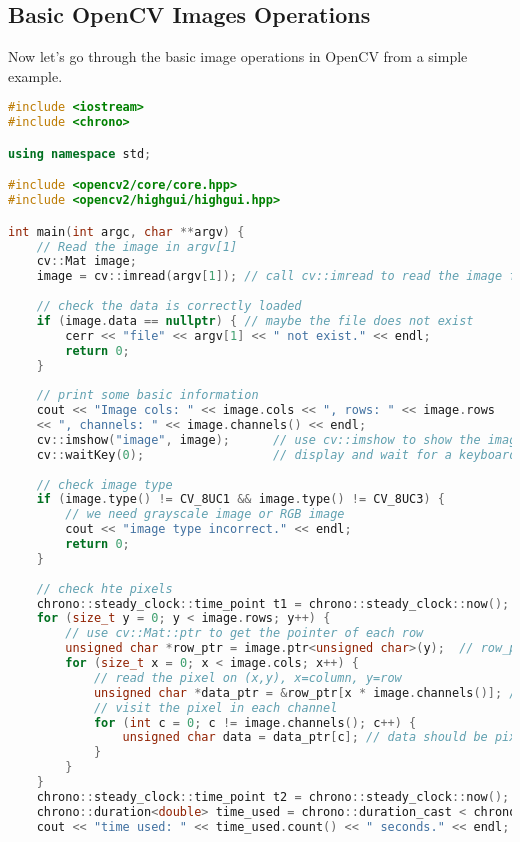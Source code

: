 \subsection{Basic OpenCV Images Operations}
Now let's go through the basic image operations in OpenCV from a simple example.

\begin{lstlisting}[language=C++,caption=slambook/ch5/imageBasics/imageBasics.cpp]
#include <iostream>
#include <chrono>

using namespace std;

#include <opencv2/core/core.hpp>
#include <opencv2/highgui/highgui.hpp>

int main(int argc, char **argv) {
    // Read the image in argv[1]
    cv::Mat image;
    image = cv::imread(argv[1]); // call cv::imread to read the image from file
    
    // check the data is correctly loaded
    if (image.data == nullptr) { // maybe the file does not exist
        cerr << "file" << argv[1] << " not exist." << endl;
        return 0;
    }
    
    // print some basic information
    cout << "Image cols: " << image.cols << ", rows: " << image.rows 
    << ", channels: " << image.channels() << endl;
    cv::imshow("image", image);      // use cv::imshow to show the image
    cv::waitKey(0);                  // display and wait for a keyboard input
    
    // check image type
    if (image.type() != CV_8UC1 && image.type() != CV_8UC3) {
        // we need grayscale image or RGB image
        cout << "image type incorrect." << endl;
        return 0;
    }
    
    // check hte pixels
    chrono::steady_clock::time_point t1 = chrono::steady_clock::now();
    for (size_t y = 0; y < image.rows; y++) {
        // use cv::Mat::ptr to get the pointer of each row
        unsigned char *row_ptr = image.ptr<unsigned char>(y);  // row_ptr is the pointer to y-th row
        for (size_t x = 0; x < image.cols; x++) {
            // read the pixel on (x,y), x=column, y=row
            unsigned char *data_ptr = &row_ptr[x * image.channels()]; // data_ptr is the pointer to (x,y)
            // visit the pixel in each channel
            for (int c = 0; c != image.channels(); c++) {
                unsigned char data = data_ptr[c]; // data should be pixel of I(x,y) in c-th channel
            }
        }
    }
    chrono::steady_clock::time_point t2 = chrono::steady_clock::now();
    chrono::duration<double> time_used = chrono::duration_cast < chrono::duration < double >> (t2 - t1);
    cout << "time used: " << time_used.count() << " seconds." << endl;
    

\end{lstlisting}
